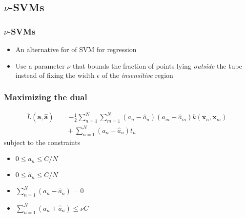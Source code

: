 \documentclass[t,14pt]{beamer}
\begin{document}
\subsection{$\nu$-SVMs}

\begin{frame}
  \frametitle{$\nu$-SVMs}
  \begin{itemize}
    \item {An alternative for of SVM for regression}
    \item {
            Use a parameter $\nu$ that bounds the fraction of points lying 
            \textit{outside} the tube instead of fixing the width $\epsilon$ 
            of the \textit{insensitive} region
          }
  \end{itemize}
\end{frame}

\begin{frame}
  \frametitle{Maximizing the dual}
  \vspace{-2em}
  \begin{align} 
    \widetilde{L}(\mathbf{a}, \widehat{\mathbf{a}}) &= 
        -\frac{\displaystyle 1}{\displaystyle 2}
        \sum\limits_{n=1}^N \sum\limits_{m=1}^N 
            (a_n - \widehat{a}_n)(a_m - \widehat{a}_m)
            k(\mathbf{x}_n,\mathbf{x}_m) \nonumber \\
            &\quad + \sum\limits_{n=1}^N(a_n - \widehat{a}_n)t_n
  \end{align}
  subject to the constraints
  \begin{multicols}{2}
  \begin{itemize}
    \item {$0 \leq a_n \leq C/N$}
    \item {$0 \leq \widehat{a}_n \leq C/N$}
    \item {$\sum\limits_{n=1}^N(a_n - \widehat{a}_n) = 0$} 
    \vfill
    \columnbreak
    \item {$\sum\limits_{n=1}^N(a_n + \widehat{a}_n) \leq \nu C$} 
  \end{itemize}
  \end{multicols}
\end{frame}
\end{document}
